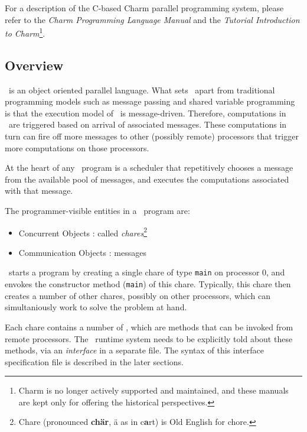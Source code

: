 For a description of the C-based {\sc Charm} parallel programming system,
please refer to the {\sl Charm Programming Language Manual} and the
{\sl Tutorial Introduction to Charm}\footnote{{\sc Charm} is no longer
actively supported and maintained, and these manuals are kept only for
offering the historical perspectives.}.

\subsection{Overview}


\charmpp\ is an object oriented parallel language. What sets \charmpp\
apart from traditional programming models such as message passing
and shared variable programming is that the execution model of
\charmpp\ is message-driven. Therefore, computations in \charmpp\
are triggered based on arrival of associated messages. These
computations in turn can fire off more messages to other (possibly remote)
processors that trigger more computations on those processors.

At the heart of any \charmpp\ program is a scheduler that
repetitively chooses a message from the available pool of messages,
and executes the computations associated with that message.

The programmer-visible entities in a \charmpp\ program are:

\begin{itemize}
\item Concurrent Objects : called {\em chares}\footnote{
      Chare (pronounced {\bf ch\"ar}, \"a as in c{\bf a}rt) is Old 
      English for chore.
      }
\item Communication Objects : messages
\end{itemize}

\charmpp\ starts a program by creating a single  chare of
type {\tt main} on processor 0, and envokes the constructor method 
({\tt main}) of this chare. Typically, this chare 
then creates a number of other \index{chare} chares, possibly on 
other processors, which can simultaniously work to 
solve the problem at hand.

Each chare contains a number of 
, which 
are methods that can be invoked from remote processors. The \charmpp\ runtime 
system needs to be explicitly told about these methods, via 
an {\em interface} in a separate file.
The syntax of this interface specification file is described in the later
sections.

